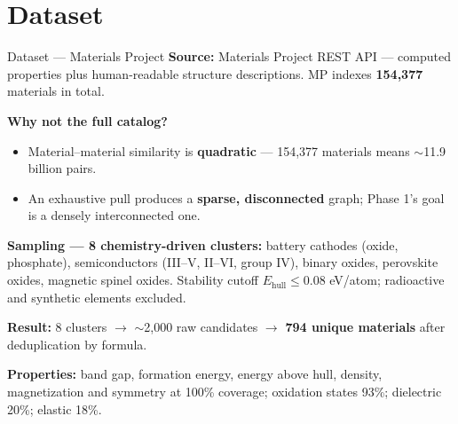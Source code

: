 \documentclass{beamer}
\begin{document}
\section{Dataset}
\begin{frame}{Dataset --- Materials Project}
\textbf{Source:} Materials Project REST API --- computed properties plus human-readable structure descriptions. MP indexes \textbf{154,377} materials in total.

\vspace{0.2cm}
\textbf{Why not the full catalog?}
    \begin{itemize}
        \item Material--material similarity is \textbf{quadratic} --- 154,377 materials means $\sim$11.9 billion pairs.
        \item An exhaustive pull produces a \textbf{sparse, disconnected} graph; Phase 1's goal is a densely interconnected one.
    \end{itemize}

\vspace{0.2cm}
\textbf{Sampling --- 8 chemistry-driven clusters:} battery cathodes (oxide, phosphate), semiconductors (III--V, II--VI, group IV), binary oxides, perovskite oxides, magnetic spinel oxides. Stability cutoff $E_{\text{hull}} \leq 0.08$ eV/atom; radioactive and synthetic elements excluded.

\vspace{0.2cm}
\textbf{Result:} 8 clusters $\rightarrow$ $\sim$2,000 raw candidates $\rightarrow$ \textbf{794 unique materials} after deduplication by formula.

\vspace{0.1cm}
\textbf{Properties:} band gap, formation energy, energy above hull, density, magnetization and symmetry at 100\% coverage; oxidation states 93\%; dielectric 20\%; elastic 18\%.
\end{frame}
\end{document}
